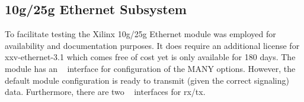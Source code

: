 \subsection{10g/25g Ethernet Subsystem}
To facilitate testing the Xilinx 10g/25g Ethernet module was employed for availability and documentation purposes. It does require an additional license for xxv-ethernet-3.1 which comes free of cost yet is only available for 180 days. 
The module has an \axifull~ interface for configuration of the MANY options. However, the default module configuration is ready to transmit (given the correct signaling) data. Furthermore, there are two \axistream~ interfaces for rx/tx. 





